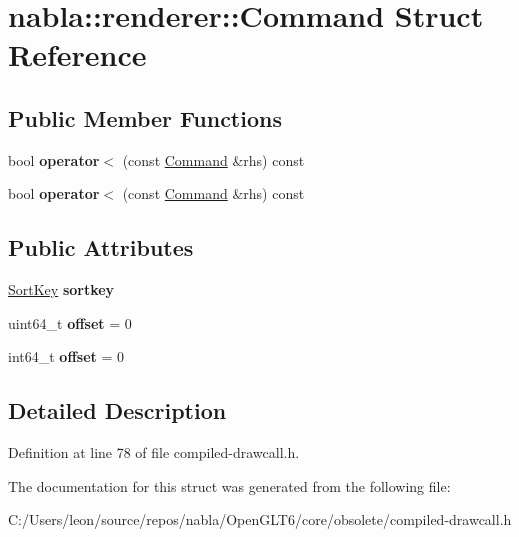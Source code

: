 \hypertarget{structnabla_1_1renderer_1_1_command}{}\section{nabla\+::renderer\+::Command Struct Reference}
\label{structnabla_1_1renderer_1_1_command}
\subsection*{Public Member Functions}
\begin{DoxyCompactItemize}
\item 
\mbox{\label{structnabla_1_1renderer_1_1_command_a99ad832c63e10db45e7ce1fdbba86381}} 
bool {\bfseries operator$<$} (const \mbox{\hyperlink{structnabla_1_1renderer_1_1_command}{Command}} \&rhs) const
\item 
\mbox{\label{structnabla_1_1renderer_1_1_command_a99ad832c63e10db45e7ce1fdbba86381}} 
bool {\bfseries operator$<$} (const \mbox{\hyperlink{structnabla_1_1renderer_1_1_command}{Command}} \&rhs) const
\end{DoxyCompactItemize}
\subsection*{Public Attributes}
\begin{DoxyCompactItemize}
\item 
\mbox{\label{structnabla_1_1renderer_1_1_command_a8098b8ea7ab7f50f5524e7e57b2e6ebd}} 
\mbox{\hyperlink{structnabla_1_1renderer_1_1_sort_key}{Sort\+Key}} {\bfseries sortkey}
\item 
\mbox{\label{structnabla_1_1renderer_1_1_command_abf8f8d6a68e432c9f1a0d01f63d6552c}} 
uint64\+\_\+t {\bfseries offset} = 0
\item 
\mbox{\label{structnabla_1_1renderer_1_1_command_a8351f1223ac523835b94179d79a4af0f}} 
int64\+\_\+t {\bfseries offset} = 0
\end{DoxyCompactItemize}


\subsection{Detailed Description}


Definition at line 78 of file compiled-\/drawcall.\+h.



The documentation for this struct was generated from the following file\+:\begin{DoxyCompactItemize}
\item 
C\+:/\+Users/leon/source/repos/nabla/\+Open\+G\+L\+T6/core/obsolete/compiled-\/drawcall.\+h\end{DoxyCompactItemize}
